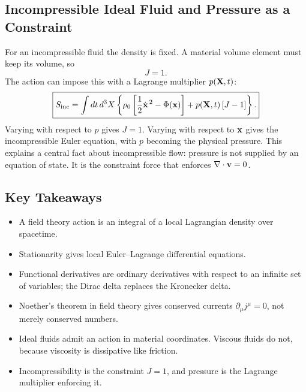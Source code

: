 \documentclass[../main.tex]{subfiles}
\begin{document}
\subsection{Incompressible Ideal Fluid and Pressure as a Constraint}
For an incompressible fluid the density is fixed.  A material volume element
must keep its volume, so
\begin{equation}
  J=1.
  \label{eq:lec23_incompressibility_j}
\end{equation}
The action can impose this with a Lagrange multiplier $p(\mathbf{X},t)$:
\begin{equation}
  \boxed{
  S_{\rm inc}=\int dt\,d^3X\left\{
  \rho_0\left[\frac12\dot{\mathbf{x}}^{\,2}-\Phi(\mathbf{x})\right]
  +p(\mathbf{X},t)\,[J-1]
  \right\}.}
  \label{eq:lec23_incompressible_action}
\end{equation}
Varying with respect to $p$ gives $J=1$.  Varying with respect to $\mathbf{x}$ gives
the incompressible Euler equation, with $p$ becoming the physical pressure.  This
explains a central fact about incompressible flow: pressure is not supplied by
an equation of state.  It is the constraint force that enforces
$\nabla \cdot\mathbf{v}=0$.

\subsection*{Key Takeaways}
\begin{itemize}
  \item A field theory action is an integral of a local Lagrangian density over
    spacetime.
  \item Stationarity gives local Euler--Lagrange differential equations.
  \item Functional derivatives are ordinary derivatives with respect to an
    infinite set of variables; the Dirac delta replaces the Kronecker delta.
  \item Noether's theorem in field theory gives conserved currents
    $\partial_\mu j^\mu=0$, not merely conserved numbers.
  \item Ideal fluids admit an action in material coordinates.  Viscous fluids do
    not, because viscosity is dissipative like friction.
  \item Incompressibility is the constraint $J=1$, and pressure is the Lagrange
    multiplier enforcing it.
\end{itemize}
\end{document}
